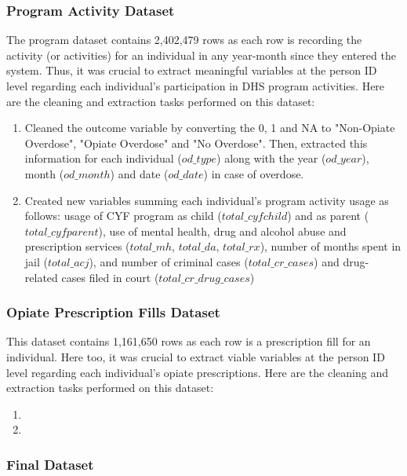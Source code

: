\documentclass[twoside,10.5pt]{article}
\begin{document}
\subsubsection{Program Activity Dataset}
The program dataset contains 2,402,479 rows as each row is recording the activity (or activities) for an individual in any year-month since they entered the system. Thus, it was crucial to extract meaningful variables at the person ID level regarding each individual's participation in DHS program activities. Here are the cleaning and extraction tasks performed on this dataset:
\begin{enumerate}[topsep=0pt,itemsep=-1ex,partopsep=1ex,parsep=1ex]
  \item Cleaned the outcome variable by converting the 0, 1 and NA to "Non-Opiate Overdose", "Opiate Overdose" and "No Overdose". Then, extracted this information for each individual ($od\_type$) along with the year ($od\_year$), month ($od\_month$) and date ($od\_date$) in case of overdose.
  \item Created new variables summing each individual's program activity usage as follows: usage of CYF program as child ($total\_cyfchild$) and as parent ($total\_cyfparent$), use of mental health, drug and alcohol abuse and prescription services ($total\_mh$, $total\_da$, $total\_rx$), number of months spent in jail ($total\_acj$), and number of criminal cases ($total\_cr\_cases$) and drug-related cases filed in court ($total\_cr\_drug\_cases$) 
\end{enumerate}

\subsubsection{Opiate Prescription Fills Dataset}
This dataset contains 1,161,650 rows as each row is a prescription fill for an individual. Here too, it was crucial to extract viable variables at the person ID level regarding each individual's opiate prescriptions. Here are the cleaning and extraction tasks performed on this dataset:
\begin{enumerate}[topsep=0pt,itemsep=-1ex,partopsep=1ex,parsep=1ex]
  \item 
  \item 
\end{enumerate}

\subsubsection{Final Dataset}
\end{document}
